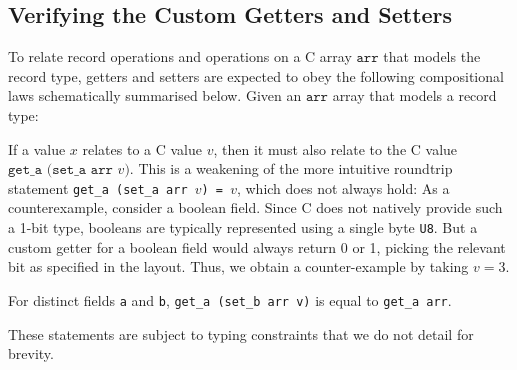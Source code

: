 \subsection{Verifying the Custom Getters and Setters}
\label{sec:get-set-lemmas}

To relate \cogent record operations and operations on a C array
$\texttt{arr}$ that models the record type, getters and setters are
expected to obey the following compositional laws schematically
summarised below. Given an $\texttt{arr}$ array that models a record
type:
\begin{description}[leftmargin=\parindent,labelindent=\parindent]
  \item[\text{[Roundtrip]}]
    If a \cogent value $x$ relates to a C value $v$,
    then it must also relate to the C value
    $\texttt{get\_a\ (set\_a\ arr\ $v$)}$.
    This is a weakening of the more intuitive roundtrip statement
\texttt{get\_a\ (set\_a\ arr $v$)\ =\ $v$}, which does not always hold:
As a counterexample, consider a boolean field. Since C does not natively provide such a 1-bit type,
booleans are typically represented using a single byte \lstinline{U8}. But a custom getter
for a boolean field would always return 0 or 1, picking 
the relevant bit as specified in the layout. Thus, we obtain a counter-example by taking $v=3$.
  \item[\text{[Frame]}]
    For distinct fields \texttt{a} and \texttt{b},
    \texttt{get\_a\ (set\_b\ arr\ v)} is equal to \texttt{get\_a\ arr}.
\end{description}
These statements are subject to typing constraints that we do not detail for brevity.


